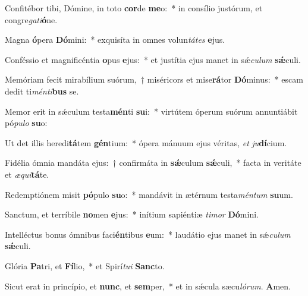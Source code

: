 \item Confitébor tibi, Dómine, in toto \textbf{cor}de \textbf{me}o:~* in consílio justórum, et congre\textit{ga}\textit{ti}\textbf{ó}ne.

\item Magna \textbf{ó}pera \textbf{Dó}mini:~* exquisíta in omnes volun\textit{tá}\textit{tes} \textbf{e}jus.

\item Conféssio et magnificéntia \textbf{o}pus \textbf{e}jus:~* et justítia ejus manet in sǽ\textit{cu}\textit{lum} \textbf{sǽ}culi.

\item Memóriam fecit mirabílium suórum,~† miséricors et mise\textbf{rá}tor \textbf{Dó}minus:~* escam dedit ti\textit{mén}\textit{ti}\textbf{bus} se.

\item Memor erit in sǽculum testa\textbf{mén}ti \textbf{su}i:~* virtútem óperum suórum annuntiábit pó\textit{pu}\textit{lo} \textbf{su}o:

\item Ut det illis heredi\textbf{tá}tem \textbf{gén}tium:~* ópera mánuum ejus véritas, \textit{et} \textit{ju}\textbf{dí}cium.

\item Fidélia ómnia mandáta ejus:~† confirmáta in \textbf{sǽ}culum \textbf{sǽ}culi,~* facta in veritáte et \textit{æ}\textit{qui}\textbf{tá}te.

\item Redemptiónem misit \textbf{pó}pulo \textbf{su}o:~* mandávit in ætérnum testa\textit{mén}\textit{tum} \textbf{su}um.

\item Sanctum, et terríbile \textbf{no}men \textbf{e}jus:~* inítium sapiéntiæ \textit{ti}\textit{mor} \textbf{Dó}mini.

\item Intelléctus bonus ómnibus faci\textbf{én}tibus \textbf{e}um:~* laudátio ejus manet in sǽ\textit{cu}\textit{lum} \textbf{sǽ}culi.

\item Glória \textbf{Pa}tri, et \textbf{Fí}lio,~* et Spirí\textit{tu}\textit{i} \textbf{Sanc}to.

\item Sicut erat in princípio, et \textbf{nunc}, et \textbf{sem}per,~* et in sǽcula sæcu\textit{ló}\textit{rum}. \textbf{A}men.